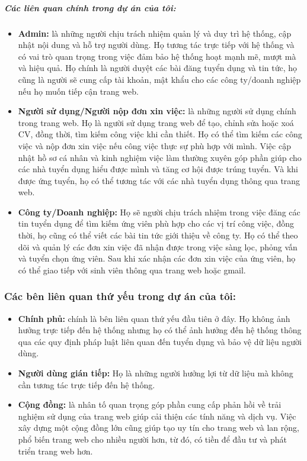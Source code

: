 \subparagraph{Các liên quan chính trong dự án của tôi:}
\begin{itemize}
    \item  \textbf{Admin:} là những người chịu trách nhiệm quản lý và duy trì hệ thống, cập nhật nội dung và hỗ trợ người dùng. Họ tương tác trực tiếp với hệ thống và có vai trò quan trọng trong việc đảm bảo hệ thống hoạt mạnh mẽ, mượt mà và hiệu quả. Họ chính là người duyệt các bài đăng tuyển dụng và tin tức, họ cũng là người sẽ cung cấp tài khoản, mật khẩu cho các công ty/doanh nghiệp nếu họ muốn tiếp cận trang web.
    \item \textbf{Người sử dụng/Người nộp đơn xin việc:} là những người sử dụng chính trong trang web. Họ là người sử dụng trang web để tạo, chỉnh sửa hoặc xoá CV, đồng thời, tìm kiếm công việc khi cần thiết. Họ có thể tìm kiếm các công việc và nộp đơn xin việc nếu công việc thực sự phù hợp với mình. Việc cập nhật hồ sơ cá nhân và kinh nghiệm việc làm thường xuyên góp phần giúp cho các nhà tuyển dụng hiểu được mình và tăng cơ hội được trúng tuyển. Và khi được ứng tuyển, họ có thể tương tác với các nhà tuyển dụng thông qua trang web.
    \item \textbf{Công ty/Doanh nghiệp:} Họ sẽ người chịu trách nhiệm trong việc đăng các tin tuyển dụng để tìm kiếm ứng viên phù hợp cho các vị trí công việc, đồng thời, họ cũng có thể viết các bài tin tức giới thiệu về công ty. Họ có thể theo dõi và quản lý các đơn xin việc đã nhận được trong việc sàng lọc, phỏng vấn và tuyển chọn ứng viên. Sau khi xác nhận các đơn xin việc của ứng viên, họ có thể giao tiếp với sinh viên thông qua trang web hoặc gmail.
\end{itemize}

\subsubsection{Các bên liên quan thứ yếu trong dự án của tôi:}
\begin{itemize}
    \item \textbf{Chính phủ:} chính là bên liên quan thứ yếu đầu tiên ở đây. Họ không ảnh hưởng trực tiếp đến hệ thống nhưng họ có thể ảnh hưởng đến hệ thống thông qua các quy định pháp luật liên quan đến tuyển dụng và bảo vệ dữ liệu người dùng.
    \item \textbf{Người dùng gián tiếp:} Họ là những người hưởng lợi từ dữ liệu mà không cần tương tác trực tiếp đến hệ thống.
    \item \textbf{Cộng đồng:} là nhân tố quan trọng góp phần cung cấp phản hồi về trải nghiệm sử dụng của trang web giúp cải thiện các tính năng và dịch vụ. Việc xây dựng một cộng đồng lớn cũng giúp tạo uy tín cho trang web và lan rộng, phổ biến trang web cho nhiều người hơn, từ đó, có tiền để đầu tư và phát triển trang web hơn.
\end{itemize}

